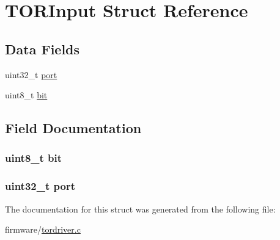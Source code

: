 \hypertarget{struct_t_o_r_input}{\section{T\-O\-R\-Input Struct Reference}
\label{struct_t_o_r_input}
}
\subsection*{Data Fields}
\begin{DoxyCompactItemize}
\item 
uint32\-\_\-t \hyperlink{struct_t_o_r_input_a83a04ad582de2b7d36b96f9db429c2c6}{port}
\item 
uint8\-\_\-t \hyperlink{struct_t_o_r_input_ad15e9d6879273cee61ab5b915db182a7}{bit}
\end{DoxyCompactItemize}


\subsection{Field Documentation}
\hypertarget{struct_t_o_r_input_ad15e9d6879273cee61ab5b915db182a7}{
\subsubsection[{bit}]{\setlength{\rightskip}{0pt plus 5cm}uint8\-\_\-t bit}}\label{struct_t_o_r_input_ad15e9d6879273cee61ab5b915db182a7}
\hypertarget{struct_t_o_r_input_a83a04ad582de2b7d36b96f9db429c2c6}{
\subsubsection[{port}]{\setlength{\rightskip}{0pt plus 5cm}uint32\-\_\-t port}}\label{struct_t_o_r_input_a83a04ad582de2b7d36b96f9db429c2c6}


The documentation for this struct was generated from the following file\-:\begin{DoxyCompactItemize}
\item 
firmware/\hyperlink{tordriver_8c}{tordriver.\-c}\end{DoxyCompactItemize}

